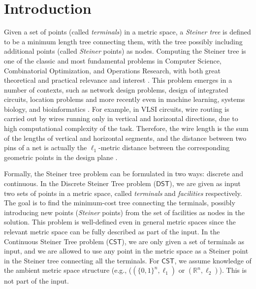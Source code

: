 \documentclass{article}\providecommand{\DeclareRedundantLanguages}[2]{}\usepackage[a4paper,margin=20mm]{geometry}
\newcommand{\R}{\mathbb{R}}
\newcommand{\1}{\textbf{1}}
\newcommand{\cst}{$\mathsf{CST}$\xspace}
\newcommand{\dst}{$\mathsf{DST}$\xspace}
\newcommand{\apx}{$\mathsf{APX}$\xspace}
\begin{document}
\begin{abstract}
Due to the discrete structure of the Hamming space, the \apx-hardness of \cst in the $\ell_0$ and $\ell_1$ metrics follow from similar methods. However, these techniques do not extend to \cst in other $\ell_p$-metrics. To show \apx-hardness of \cst in the $\ell_{\infty}$-metric, we instead rely on the robust hardness guarantees of graph coloring problems. Concretely, we present a reduction from a graph $G$ on $n$ vertices to a point-set $P$  in the $\ell_\infty$-metric space, where the cost of the optimal Steiner tree of $P$ is exactly $\frac{n+\chi(G)}{2}$, where $\chi(G)$ is the chromatic number of $G$. 
\end{abstract}
 
 

\section{Introduction}


Given a set of points (called \emph{terminals}) in a metric space, a \emph{Steiner tree} is defined to be a minimum length tree connecting them, with the tree possibly including additional points (called \emph{Steiner} points) as nodes. Computing the Steiner
tree is one of the classic and most fundamental problems in Computer Science, Combinatorial Optimization, and Operations Research, with both great theoretical and practical relevance and interest \cite{ljubic2021solving}. 
This problem
emerges in a number of contexts, such as network design problems, design of integrated circuits, location problems \cite{cheng2013steiner,cho2001steiner,hwang1992steiner,lengauer2012combinatorial,resende2008handbook,noormohammadpour2017dccast}  and
more recently even in machine learning, systems biology, and bioinformatics \cite{backes2012integer,ideker2002discovering,russakovsky2010steiner, tuncbag2016network}.
For example, in VLSI circuits, wire routing is carried out by wires running only in vertical and horizontal directions, due to high computational complexity of the task. Therefore, the wire length is the sum of the lengths of vertical and horizontal segments, and the distance between two pins of a net is actually the $\ell_1$-metric  distance between the corresponding geometric points in the design plane \cite{sherwani2012algorithms}. 

Formally, the Steiner tree problem can be formulated in two ways: discrete and continuous. In the Discrete Steiner Tree problem (\dst), we are given as input two sets of points in a metric space, called \emph{terminals} and \emph{facilities} respectively. The goal is to find the minimum-cost tree connecting the terminals, possibly introducing new points (\emph{Steiner} points) from the set of facilities as nodes in the solution. This problem is well-defined even in general metric spaces since the relevant metric space can be fully described as part of the input. In the Continuous Steiner Tree problem (\cst), we are only given a set of terminals as input, and we are allowed to use any point in the metric space as a Steiner point in the Steiner tree connecting all the terminals. For \cst, we assume knowledge of the ambient metric space structure (e.g., ($(\{0,1\}^n, \ell_1)$ or $(\R^n, \ell_2)$). This is not part of the input.
\end{document}
